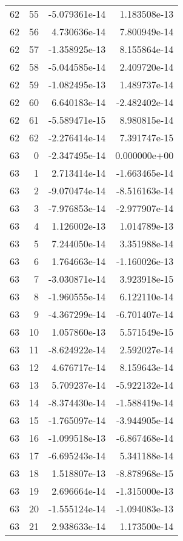 \begin{tabular}{rrrr}
  62 &   55 & -5.079361e-14 &  1.183508e-13 \\
  62 &   56 &  4.730636e-14 &  7.800949e-14 \\
  62 &   57 & -1.358925e-13 &  8.155864e-14 \\
  62 &   58 & -5.044585e-14 &  2.409720e-14 \\
  62 &   59 & -1.082495e-13 &  1.489737e-14 \\
  62 &   60 &  6.640183e-14 & -2.482402e-14 \\
  62 &   61 & -5.589471e-15 &  8.980815e-14 \\
  62 &   62 & -2.276414e-14 &  7.391747e-15 \\
  63 &    0 & -2.347495e-14 &  0.000000e+00 \\
  63 &    1 &  2.713414e-14 & -1.663465e-14 \\
  63 &    2 & -9.070474e-14 & -8.516163e-14 \\
  63 &    3 & -7.976853e-14 & -2.977907e-14 \\
  63 &    4 &  1.126002e-13 &  1.014789e-13 \\
  63 &    5 &  7.244050e-14 &  3.351988e-14 \\
  63 &    6 &  1.764663e-14 & -1.160026e-13 \\
  63 &    7 & -3.030871e-14 &  3.923918e-15 \\
  63 &    8 & -1.960555e-14 &  6.122110e-14 \\
  63 &    9 & -4.367299e-14 & -6.701407e-14 \\
  63 &   10 &  1.057860e-13 &  5.571549e-15 \\
  63 &   11 & -8.624922e-14 &  2.592027e-14 \\
  63 &   12 &  4.676717e-14 &  8.159643e-14 \\
  63 &   13 &  5.709237e-14 & -5.922132e-14 \\
  63 &   14 & -8.374430e-14 & -1.588419e-14 \\
  63 &   15 & -1.765097e-14 & -3.944905e-14 \\
  63 &   16 & -1.099518e-13 & -6.867468e-14 \\
  63 &   17 & -6.695243e-14 &  5.341188e-14 \\
  63 &   18 &  1.518807e-13 & -8.878968e-15 \\
  63 &   19 &  2.696664e-14 & -1.315000e-13 \\
  63 &   20 & -1.555124e-14 & -1.094083e-13 \\
  63 &   21 &  2.938633e-14 &  1.173500e-14 \\

\end{tabular}
